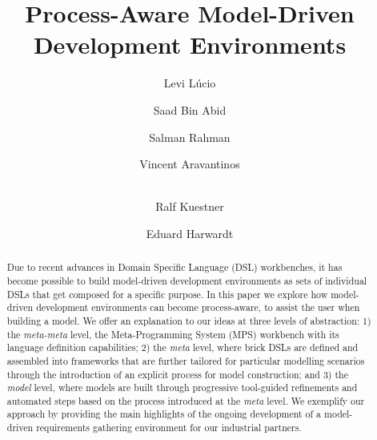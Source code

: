 \documentclass{llncs}
\begin{document}
%
\frontmatter          %

\mainmatter              %
%
\title{Process-Aware Model-Driven Development Environments}
%
\titlerunning{}  %
%
\author{Levi L\'ucio \and Saad Bin Abid
 \and Salman Rahman \and Vincent
Aravantinos\and\\ Ralf Kuestner\and Eduard Harwardt}
%
\authorrunning{} %
%
\tocauthor{}
%

\maketitle            
\begin{abstract}
\vspace{-.7cm}
Due to recent advances in Domain Specific Language (DSL) workbenches, it has
become possible to build model-driven development environments as sets of
individual DSLs that get composed for a specific purpose.
In this paper we explore how model-driven development environments can
become process-aware, to assist the user when building a model.
We offer an explanation to our ideas at three levels of abstraction:
1) the \emph{meta-meta} level, the Meta-Programming System (MPS) workbench with
its language definition capabilities; 2) the \emph{meta} level, where brick DSLs
are defined and assembled into frameworks that are further tailored for
particular modelling scenarios through the introduction of an explicit process for model construction; and 3) the \emph{model} level, where
models are built through progressive tool-guided refinements and automated
steps based on the process introduced at the \emph{meta} level.
We exemplify our approach by providing the main highlights of the ongoing
development of a model-driven requirements gathering environment for our
industrial partners.
\vspace{-.7cm}
\end{abstract} 
\end{document}
